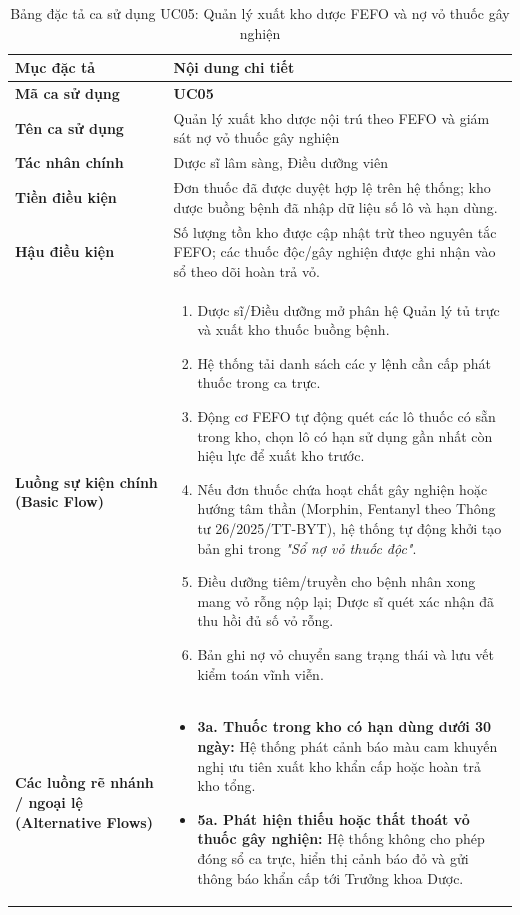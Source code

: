 \begin{table}[htbp]
\centering
\small
\begin{tabularx}{\textwidth}{L{3.2cm} Y}
\toprule
\textbf{Mục đặc tả} & \textbf{Nội dung chi tiết} \\
\midrule
\textbf{Mã ca sử dụng} & \textbf{UC05} \\
\textbf{Tên ca sử dụng} & Quản lý xuất kho dược nội trú theo FEFO và giám sát nợ vỏ thuốc gây nghiện \\
\textbf{Tác nhân chính} & Dược sĩ lâm sàng, Điều dưỡng viên \\
\textbf{Tiền điều kiện} & Đơn thuốc đã được duyệt hợp lệ trên hệ thống; kho dược buồng bệnh đã nhập dữ liệu số lô và hạn dùng. \\
\textbf{Hậu điều kiện} & Số lượng tồn kho được cập nhật trừ theo nguyên tắc FEFO; các thuốc độc/gây nghiện được ghi nhận vào sổ theo dõi hoàn trả vỏ. \\
\midrule
\textbf{Luồng sự kiện chính (Basic Flow)} & 
\begin{enumerate}[leftmargin=1.2em, topsep=0pt, partopsep=0pt]
    \item Dược sĩ/Điều dưỡng mở phân hệ Quản lý tủ trực và xuất kho thuốc buồng bệnh.
    \item Hệ thống tải danh sách các y lệnh cần cấp phát thuốc trong ca trực.
    \item Động cơ FEFO tự động quét các lô thuốc có sẵn trong kho, chọn lô có hạn sử dụng gần nhất còn hiệu lực để xuất kho trước.
    \item Nếu đơn thuốc chứa hoạt chất gây nghiện hoặc hướng tâm thần (Morphin, Fentanyl theo Thông tư 26/2025/TT-BYT), hệ thống tự động khởi tạo bản ghi trong \textit{"Sổ nợ vỏ thuốc độc"}.
    \item Điều dưỡng tiêm/truyền cho bệnh nhân xong mang vỏ rỗng nộp lại; Dược sĩ quét xác nhận đã thu hồi đủ số vỏ rỗng.
    \item Bản ghi nợ vỏ chuyển sang trạng thái  và lưu vết kiểm toán vĩnh viễn.
\end{enumerate} \\
\midrule
\textbf{Các luồng rẽ nhánh / ngoại lệ (Alternative Flows)} & 
\begin{itemize}[leftmargin=1.2em, topsep=0pt, partopsep=0pt]
    \item \textbf{3a. Thuốc trong kho có hạn dùng dưới 30 ngày:} Hệ thống phát cảnh báo màu cam khuyến nghị ưu tiên xuất kho khẩn cấp hoặc hoàn trả kho tổng.
    \item \textbf{5a. Phát hiện thiếu hoặc thất thoát vỏ thuốc gây nghiện:} Hệ thống không cho phép đóng sổ ca trực, hiển thị cảnh báo đỏ và gửi thông báo khẩn cấp tới Trưởng khoa Dược.
\end{itemize} \\
\bottomrule
\end{tabularx}
\caption{Bảng đặc tả ca sử dụng UC05: Quản lý xuất kho dược FEFO và nợ vỏ thuốc gây nghiện}
\label{tab:uc05_spec}
\end{table}

